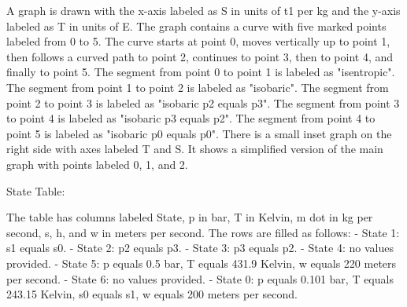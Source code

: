 A graph is drawn with the x-axis labeled as S in units of t1 per kg and the y-axis labeled as T in units of E. The graph contains a curve with five marked points labeled from 0 to 5. The curve starts at point 0, moves vertically up to point 1, then follows a curved path to point 2, continues to point 3, then to point 4, and finally to point 5. The segment from point 0 to point 1 is labeled as "isentropic". The segment from point 1 to point 2 is labeled as "isobaric". The segment from point 2 to point 3 is labeled as "isobaric p2 equals p3". The segment from point 3 to point 4 is labeled as "isobaric p3 equals p2". The segment from point 4 to point 5 is labeled as "isobaric p0 equals p0". There is a small inset graph on the right side with axes labeled T and S. It shows a simplified version of the main graph with points labeled 0, 1, and 2.

State Table:

The table has columns labeled State, p in bar, T in Kelvin, m dot in kg per second, s, h, and w in meters per second. The rows are filled as follows:
- State 1: s1 equals s0.
- State 2: p2 equals p3.
- State 3: p3 equals p2.
- State 4: no values provided.
- State 5: p equals 0.5 bar, T equals 431.9 Kelvin, w equals 220 meters per second.
- State 6: no values provided.
- State 0: p equals 0.101 bar, T equals 243.15 Kelvin, s0 equals s1, w equals 200 meters per second.
